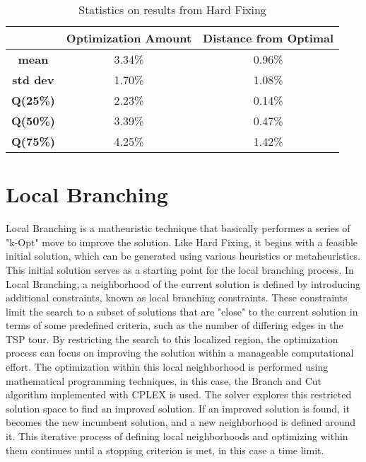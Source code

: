\begin{table}[htbp]
	\centering
	\begin{tabular}{c|c|c|}
        & \textbf{Optimization Amount} & \textbf{Distance from Optimal} \\
		\hline \textbf{mean} & 3.34\% & 0.96\% \\
		\hline \textbf{std dev} & 1.70\% & 1.08\% \\
        \hline \textbf{Q(25\%)} & 2.23\% & 0.14\% \\
        \hline \textbf{Q(50\%)} & 3.39\% & 0.47\% \\
        \hline \textbf{Q(75\%)} & 4.25\% & 1.42\% \\
	\end{tabular}
    \vspace{2mm}
	\caption{Statistics on results from Hard Fixing} \label{tab:hardfixStats}
\end{table}

\section{Local Branching}

Local Branching is a matheuristic technique that basically performes a series of "k-Opt" move to improve the solution.
Like Hard Fixing, it begins with a feasible initial solution, which can be generated using various heuristics or metaheuristics.
This initial solution serves as a starting point for the local branching process.
In Local Branching, a neighborhood of the current solution is defined by introducing additional constraints, known as local branching constraints.
These constraints limit the search to a subset of solutions that are "close" to the current solution in terms of some predefined criteria, such as the number of differing edges in the TSP tour.
By restricting the search to this localized region, the optimization process can focus on improving the solution within a manageable computational effort.
The optimization within this local neighborhood is performed using mathematical programming techniques, in this case, the Branch and Cut algorithm implemented with CPLEX is used.
The solver explores this restricted solution space to find an improved solution.
If an improved solution is found, it becomes the new incumbent solution, and a new neighborhood is defined around it.
This iterative process of defining local neighborhoods and optimizing within them continues until a stopping criterion is met, in this case a time limit.

